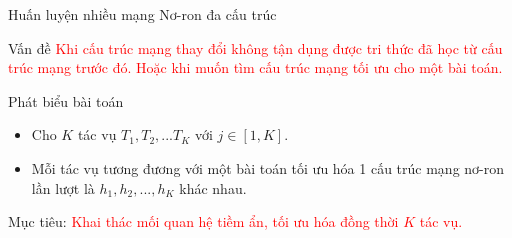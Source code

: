 	\begin{frame}{Huấn luyện nhiều mạng Nơ-ron đa cấu trúc}
		\begin{itemize}
		    \begin{block}{Vấn đề}
		        \textcolor{red}{Khi cấu trúc mạng thay đổi không tận dụng được tri thức đã học từ cấu trúc mạng trước đó. Hoặc khi muốn tìm cấu trúc mạng tối ưu cho một bài toán.}
		    \end{block}
		    \begin{block}{Phát biểu bài toán}
		        \begin{itemize}
		            \item Cho $K$ tác vụ $T_1, T_2, ... T_K$ với $j \in [1,K]$.
		            \item Mỗi tác vụ tương đương với một bài toán tối ưu hóa 1 cấu trúc mạng nơ-ron lần lượt là $h_1, h_2, ... , h_K$ khác nhau.
		        \end{itemize}
		        Mục tiêu: \textcolor{red}{Khai thác mối quan hệ tiềm ẩn, tối ưu hóa đồng thời $K$ tác vụ.}
		    \end{block}
		\end{itemize}
	\end{frame}
	

